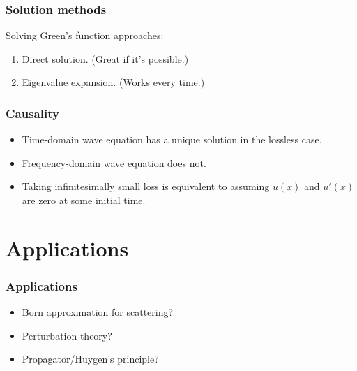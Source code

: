 \documentclass[12 pt, compress, handout, intlimits]{beamer}
\begin{document}
\note{}

\begin{frame}[fragile]
    \frametitle{Solution methods}
     Solving Green's function approaches:
    \begin{enumerate}
    \item
        Direct solution. (Great if it's possible.)
    \item
        Eigenvalue expansion. (Works every time.)
    \end{enumerate}
\end{frame}

\note{}

\begin{frame}[fragile]
    \frametitle{Causality}
    \begin{itemize}
    \item
        Time-domain wave equation has a unique solution in the lossless case.
    \item
        Frequency-domain wave equation does not.
    \item
        Taking infinitesimally small loss is equivalent to assuming $ u(x) $ and $ u'(x) $ are zero at some initial time.
    \end{itemize}
\end{frame}

\note{}

\section{Applications}
\label{sec:applications}

\note{}

\begin{frame}[fragile]
    \frametitle{Applications}
    \begin{itemize}
    \item
        Born approximation for scattering?
    \item
        Perturbation theory?
    \item
        Propagator/Huygen's principle?
    \end{itemize}
\end{frame}

\note{}
\end{document}
